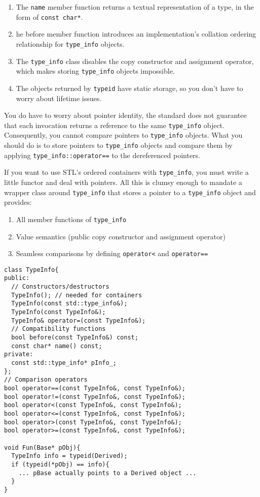 \begin{enumerate}
\item The \texttt{name} member function returns a textual
  representation of a type, in the form of \texttt{const char*}.
\item he before member function introduces an implementation's
  collation ordering relationship for \texttt{type\_info} objects.
\item The \texttt{type\_info} class disables the copy constructor and
  assignment operator, which makes storing \texttt{type\_info} objects
  impossible.
\item The objects returned by \texttt{typeid} have static storage, so
  you don't have to worry about lifetime issues.  
\end{enumerate}

You do have to worry about pointer identity, the standard does not
guarantee that each invocation returns a reference to the same
\texttt{type\_info} object. Consequently, you cannot compare pointers
to \texttt{type\_info} objects. What you should do is to store pointers
to \texttt{type\_info} objects and compare them by applying
\texttt{type\_info::operator==} to the dereferenced pointers.

If you want to use STL's ordered containers with \texttt{type\_info},
you must write a little functor and deal with pointers. All this is
clumsy enough to mandate a wrapper class around \texttt{type\_info}
that stores a pointer to a \texttt{type\_info} object and provides:
\begin{enumerate}
\item All member functions of \texttt{type\_info}
\item Value semantics (public copy constructor and assignment
  operator)
\item Seamless comparisons by defining \texttt{operator<} and
  \texttt{operator==}
\end{enumerate}

\begin{verbatim}
class TypeInfo{
public:
  // Constructors/destructors
  TypeInfo(); // needed for containers
  TypeInfo(const std::type_info&);
  TypeInfo(const TypeInfo&);
  TypeInfo& operator=(const TypeInfo&);
  // Compatibility functions
  bool before(const TypeInfo&) const;
  const char* name() const;
private:
  const std::type_info* pInfo_;
};
// Comparison operators
bool operator==(const TypeInfo&, const TypeInfo&);
bool operator!=(const TypeInfo&, const TypeInfo&);
bool operator<(const TypeInfo&, const TypeInfo&);
bool operator<=(const TypeInfo&, const TypeInfo&);
bool operator>(const TypeInfo&, const TypeInfo&);
bool operator>=(const TypeInfo&, const TypeInfo&);

void Fun(Base* pObj){
  TypeInfo info = typeid(Derived);
  if (typeid(*pObj) == info){
    ... pBase actually points to a Derived object ...
  }
}
\end{verbatim}

